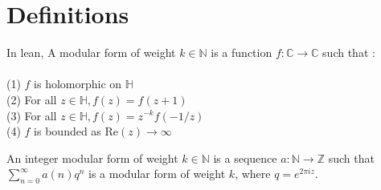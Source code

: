 




\section{Definitions}

\begin{definition} 
  \label{def:ModularForm}
  \leanok
  In lean, A modular form of weight $k \in \mathbb{N}$ is a function $f : \mathbb{C} → \mathbb{C}$ such that : \\ \\
  (1) $f$ is holomorphic on $\mathbb{H}$ \\
  (2) For all $z \in \mathbb{H}, f(z) = f(z + 1)$ \\
  (3) For all $z \in \mathbb{H}, f(z) = z^{-k} f(-1/z)$ \\
  (4) $f$ is bounded as Re$(z) \to \infty$ \\
\end{definition}

\begin{definition} 
  \label{def:IntegerModularForm}
  \leanok
  An integer modular form of weight $k \in \mathbb{N}$ is a sequence $a : \mathbb{N} → \mathbb{Z}$
  such that $\sum_{n=0}^{\infty} a(n) q^n$ is a modular form of weight $k$, where $q = e ^ {2 \pi i z}.$
\end{definition}

